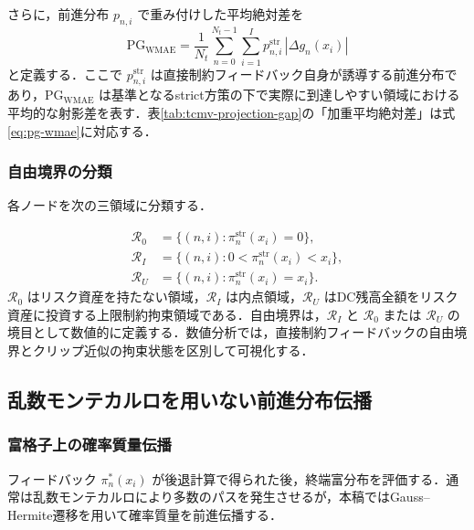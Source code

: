 \documentclass[10pt,a4paper]{article}
\theoremstyle{plain}
\theoremstyle{definition}
\begin{document}
さらに，前進分布 $p_{n,i}$ で重み付けした平均絶対差を
\begin{equation}
  \mathrm{PG}_{\mathrm{WMAE}}
  =\frac{1}{N_t}
  \sum_{n=0}^{N_t-1}\sum_{i=1}^{I}
  p_{n,i}^{\mathrm{str}}\,|\Delta g_n(x_i)|
  \label{eq:pg-wmae}
\end{equation}
と定義する．ここで $p_{n,i}^{\mathrm{str}}$ は直接制約フィードバック自身が誘導する前進分布であり，$\mathrm{PG}_{\mathrm{WMAE}}$ は基準となるstrict方策の下で実際に到達しやすい領域における平均的な射影差を表す．表\ref{tab:tcmv-projection-gap}の「加重平均絶対差」は式\eqref{eq:pg-wmae}に対応する．

\subsubsection{自由境界の分類}

各ノードを次の三領域に分類する．

\begin{align}
  \mathcal R_0&=\{(n,i):\pi_n^{\mathrm{str}}(x_i)=0\},\label{eq:R0}\\
  \mathcal R_I&=\{(n,i):0<\pi_n^{\mathrm{str}}(x_i)<x_i\},\label{eq:RI}\\
  \mathcal R_U&=\{(n,i):\pi_n^{\mathrm{str}}(x_i)=x_i\}.\label{eq:RU}
\end{align}
$\mathcal R_0$ はリスク資産を持たない領域，$\mathcal R_I$ は内点領域，$\mathcal R_U$ はDC残高全額をリスク資産に投資する上限制約拘束領域である．自由境界は，$\mathcal R_I$ と $\mathcal R_0$ または $\mathcal R_U$ の境目として数値的に定義する．数値分析では，直接制約フィードバックの自由境界とクリップ近似の拘束状態を区別して可視化する．

\subsection{乱数モンテカルロを用いない前進分布伝播}
\label{sec:forward}

\subsubsection{富格子上の確率質量伝播}

フィードバック $\pi_n^*(x_i)$ が後退計算で得られた後，終端富分布を評価する．通常は乱数モンテカルロにより多数のパスを発生させるが，本稿ではGauss--Hermite遷移を用いて確率質量を前進伝播する．
\end{document}
